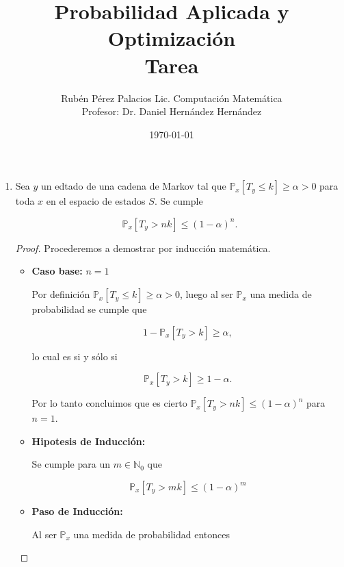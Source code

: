 \documentclass[letterpaper]{article}
\title{Probabilidad Aplicada y Optimización \\ Tarea }
\author{Rubén Pérez Palacios Lic. Computación Matemática\\Profesor: Dr. Daniel Hernández Hernández}
\date{\today}
\theoremstyle{definition}
\theoremstyle{lemathm}
\theoremstyle{lemathm}
\theoremstyle{lemathm}
\theoremstyle{lemademthm}
\newcommand{\bracs}[1]{\left[ #1 \right] }
\newcommand{\NN}{\mathbb{N}}
\newcommand{\PP}{\mathbb{P}}
\newcommand{\1}{\mathbbm{1}}
\begin{document}
	\maketitle

	\begin{enumerate}
		\item Sea $y$ un edtado de una cadena de Markov tal que $\PP_x\bracs{T_y \leq k} \geq \alpha > 0$ para toda $x$ en el espacio de estados $S$. Se cumple
		
		\[\PP_x\bracs{T_y > nk} \leq (1-\alpha)^n.\]

		\begin{proof}
			Procederemos a demostrar por inducción matemática.

			\begin{itemize}
				\item \textbf{Caso base: } $n = 1$
				
				Por definición $\PP_x\bracs{T_y \leq k} \geq \alpha > 0$, luego al ser $\PP_x$ una medida de probabilidad se cumple que

				\[1-\PP_x\bracs{T_y > k} \geq \alpha,\]

				lo cual es si y sólo si

				\[\PP_x\bracs{T_y > k} \geq 1-\alpha.\]

				Por lo tanto concluimos que es cierto $\PP_x\bracs{T_y > nk} \leq (1-\alpha)^n$ para $n=1$.

				\item \textbf{Hipotesis de Inducción: }
				
				Se cumple para un $m\in \NN_0$ que

				\[\PP_x\bracs{T_y > mk} \leq (1-\alpha)^m\]


				\item \textbf{Paso de Inducción: }
				
				Al ser $\PP_x$ una medida de probabilidad entonces


\end{itemize}
\end{proof}
\end{enumerate}
\end{document}
